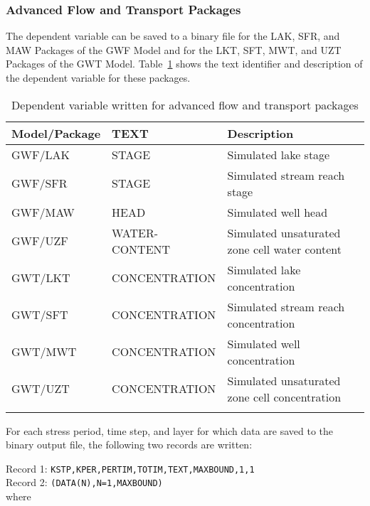 \newpage
\subsubsection{Advanced Flow and Transport Packages}

\vspace{5mm}
The dependent variable can be saved to a binary file for the LAK, SFR, and MAW Packages of the GWF Model and for the LKT, SFT, MWT, and UZT Packages of the GWT Model.  Table~\ref{table:adpdv} shows the text identifier and description of the dependent variable for these packages.

\begin{longtable}{p{3cm} p{3.5 cm} p{5cm}}
\caption{Dependent variable written for advanced flow and transport packages} 
\tabularnewline
\hline
\textbf{Model/Package} & \textbf{TEXT} & \textbf{Description}  \\
\hline
\endhead
\hline
\endfoot
GWF/LAK & STAGE & Simulated lake stage  \\
GWF/SFR & STAGE & Simulated stream reach stage  \\
GWF/MAW & HEAD & Simulated well head  \\
GWF/UZF & WATER-CONTENT & Simulated unsaturated zone cell water content \\
GWT/LKT & CONCENTRATION & Simulated lake concentration  \\
GWT/SFT & CONCENTRATION & Simulated stream reach concentration  \\
GWT/MWT & CONCENTRATION & Simulated well concentration  \\
GWT/UZT & CONCENTRATION & Simulated unsaturated zone cell concentration  \\
\label{table:adpdv}
\end{longtable}



For each stress period, time step, and layer for which data are saved to the binary output file, the following two records are written:

\vspace{5mm}
\noindent Record 1: \texttt{KSTP,KPER,PERTIM,TOTIM,TEXT,MAXBOUND,1,1} \\
\noindent Record 2: \texttt{(DATA(N),N=1,MAXBOUND)} \\

\vspace{5mm}
\noindent where


